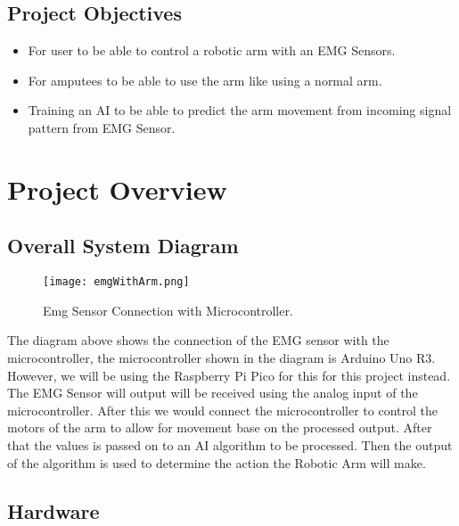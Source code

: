 \documentclass[12pt]{article}
\begin{document}
    \subsection{Project Objectives}
    \begin{itemize}
        \item For user to be able to control a robotic arm with an EMG Sensors.
        \item For amputees to be able to use the arm like using a normal arm.
        \item Training an AI to be able to predict the arm movement from incoming signal pattern from EMG Sensor.
    \end{itemize}
    \break
    \section{Project Overview}
    \subsection{Overall System Diagram}
        \begin{figure}[!h]
            \centering
            \texttt{[image: emgWithArm.png]}
            \caption{Emg Sensor Connection with Microcontroller.}
        \end{figure}
        \begin{flushleft}
            The diagram above shows the connection of the EMG sensor with the microcontroller, the microcontroller shown in the diagram is Arduino Uno R3. However, we will be using
            the Raspberry Pi Pico for this for this project instead. The EMG Sensor will output will be received using the analog input of the microcontroller. After this we would connect the
            microcontroller to control the motors of the arm to allow for movement base on the processed output. After that the values is passed on to an AI algorithm to be processed. Then the
            output of the algorithm is used to determine the action the Robotic Arm will make.
        \end{flushleft}
    \subsection{Hardware}
\end{document}
